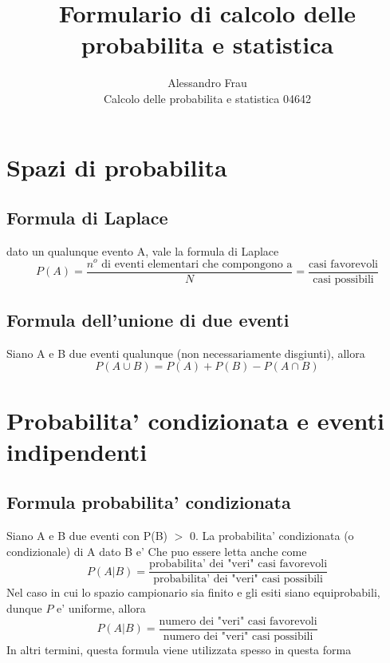 \documentclass{article}
\begin{document}
\title{Formulario di calcolo delle probabilita e statistica} 
\author{Alessandro Frau\\Calcolo delle probabilita e statistica 04642}
\maketitle
\tableofcontents
\section{Spazi di probabilita}
\subsection{Formula di Laplace}
dato un qualunque evento A, vale la formula di Laplace \newline
$$ P(A) = \frac{n^o\mbox{ di eventi elementari che compongono a}}{N} = \frac{\mbox{casi favorevoli}}{\mbox{casi possibili}} $$

\subsection{Formula dell'unione di due eventi}
Siano A e B due eventi qualunque (non necessariamente disgiunti), allora\newline
$$ P(A \cup B) = P(A) + P(B) - P(A \cap B)$$

\newpage


\section{Probabilita' condizionata e eventi indipendenti}
\subsection{Formula probabilita' condizionata}
Siano A e B due eventi con P(B) $>$ 0. La probabilita' condizionata (o condizionale) di A dato B e'\newline
{}\newline
Che puo essere letta anche come\newline
$$ P(A|B) = \frac{\mbox{probabilita' dei "veri" casi favorevoli}}{\mbox{probabilita' dei "veri" casi possibili}}$$\newline
Nel caso in cui lo spazio campionario sia finito e gli esiti siano equiprobabili, dunque $P$ e' uniforme, allora\newline
$$ P(A|B) = \frac{\mbox{numero dei "veri" casi favorevoli}}{\mbox{numero dei "veri" casi possibili}}$$\newline
In altri termini, questa formula viene utilizzata spesso in questa forma\newline
{}
\end{document}
